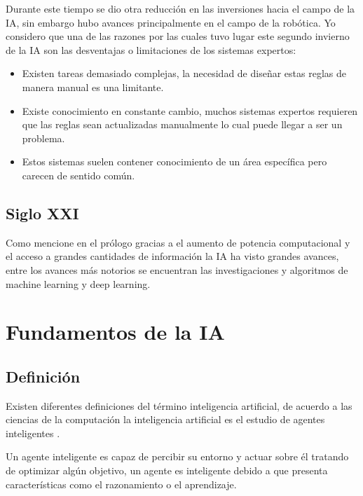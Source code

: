 \documentclass[11pt,fleqn]{book} %
\begin{document}
Durante este tiempo se dio otra reducción en las inversiones hacia el campo de la IA, sin embargo hubo avances principalmente en el campo de la robótica. Yo considero que una de las razones por las cuales tuvo lugar este segundo invierno de la IA son las desventajas o limitaciones de los sistemas expertos:

\begin{itemize}
\item Existen tareas demasiado complejas, la necesidad de diseñar estas reglas de manera manual es una limitante.
\item Existe conocimiento en constante cambio, muchos sistemas expertos requieren que las reglas sean actualizadas manualmente lo cual puede llegar a ser un problema.
\item Estos sistemas suelen contener conocimiento de un área específica pero carecen de sentido común. 
\end{itemize}

\section{Siglo XXI} 

Como mencione en el prólogo gracias a el aumento de potencia computacional y el acceso a grandes cantidades de información la IA ha visto grandes avances, entre los avances más notorios se encuentran las investigaciones y algoritmos de machine learning y deep learning.


\chapter{Fundamentos de la IA}

\section{Definición} 

Existen diferentes definiciones del término inteligencia artificial, de acuerdo a las ciencias de la computación la inteligencia artificial es el estudio de agentes inteligentes \cite{logical_approach}.

Un agente inteligente es capaz de percibir su entorno y actuar sobre él tratando de optimizar algún objetivo, un agente es inteligente debido a que presenta características como el razonamiento o el aprendizaje.
\end{document}
